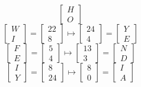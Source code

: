 \documentclass[letterpaper,10pt]{article}
\begin{document}
\begin{enumerate}
\begin{enumerate}
\begin{equation*}
            \begin{bmatrix} H \\ O \end{bmatrix}
        \end{equation*}
        \begin{equation*}
            \begin{bmatrix} W  \\ I \end{bmatrix} =
            \begin{bmatrix} 22 \\ 8 \end{bmatrix} \mapsto
            \begin{bmatrix} 24 \\ 4 \end{bmatrix} =
            \begin{bmatrix} Y \\ E \end{bmatrix}
        \end{equation*}
        \begin{equation*}
            \begin{bmatrix} F \\ E \end{bmatrix} =
            \begin{bmatrix} 5 \\ 4 \end{bmatrix} \mapsto
            \begin{bmatrix} 13 \\ 3 \end{bmatrix} =
            \begin{bmatrix} N \\ D \end{bmatrix}
        \end{equation*}
        \begin{equation*}
            \begin{bmatrix} I \\ Y \end{bmatrix} =
            \begin{bmatrix} 8 \\ 24 \end{bmatrix} \mapsto
            \begin{bmatrix} 8 \\ 0 \end{bmatrix} =
            \begin{bmatrix} I \\ A \end{bmatrix}

\end{equation*}
\end{enumerate}
\end{enumerate}
\end{document}
